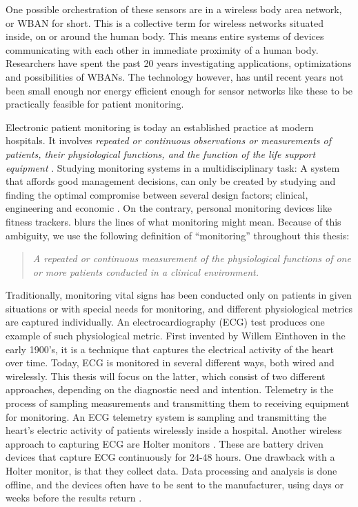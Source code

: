 One possible orchestration of these sensors are in a wireless body area network, or WBAN for short. This is a collective term for wireless networks situated inside, on or around the human body. This means entire systems of devices communicating with each other in immediate proximity of a human body. Researchers have spent the past 20 years investigating applications, optimizations and possibilities of WBANs. The technology however, has until recent years not been small enough nor energy efficient enough for sensor networks like these to be practically feasible for patient monitoring.

Electronic patient monitoring is today an established practice at modern hospitals. It involves \textit{repeated or continuous observations or measurements of patients, their physiological functions, and the function of the life support equipment} \cite{PMID:10315668}. Studying monitoring systems in a multidisciplinary task: A system that affords good management decisions, can only be created by studying and finding the optimal compromise between several design factors; clinical, engineering and economic \cite{Anonymous:yOjY0N0Y}. On the contrary, personal monitoring devices like fitness trackers. blurs the lines of what monitoring might mean. Because of this ambiguity, we use the following definition of ``monitoring'' throughout this thesis: 

\begin{quote}
	\textit{A repeated or continuous measurement of the physiological functions of one or more patients conducted in a clinical environment.} 
\end{quote}

\noindent Traditionally, monitoring vital signs has been conducted only on patients in given situations or with special needs for monitoring, and different physiological metrics are captured individually. An electrocardiography (ECG) test produces one example of such physiological metric. First invented by Willem Einthoven in the early 1900's, it is a technique that captures the electrical activity of the heart over time. Today, ECG is monitored in several different ways, both wired and wirelessly. This thesis will focus on the latter, which consist of two different approaches, depending on the diagnostic need and intention. Telemetry is the process of sampling measurements and transmitting them to receiving equipment for monitoring. An ECG telemetry system is sampling and transmitting the heart's electric activity of patients wirelessly inside a hospital. Another wireless approach to capturing ECG are Holter monitors \cite{holter:13}. These are battery driven devices that capture ECG continuously for 24-48 hours. One drawback with a Holter monitor, is that they collect data. Data processing and analysis is done offline, and the devices often have to be sent to the manufacturer, using days or weeks before the results return \cite{ziopatch:14}.

